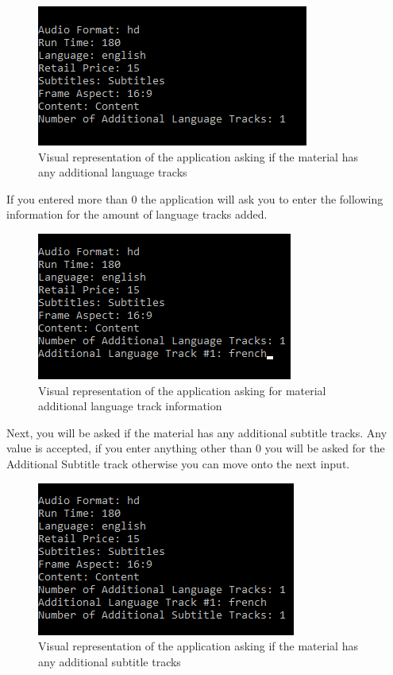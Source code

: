 \documentclass[
  english,
  a4paper,
,tablecaptionabove
]{scrartcl}
\begin{document}
\begin{figure}
\centering
\includegraphics{images/user-guide/maintenance-mode/add-material-number-of-additional-language-tracks.png}
\caption{Visual representation of the application asking if the material
has any additional language tracks}
\end{figure}

If you entered more than 0 the application will ask you to enter the
following information for the amount of language tracks added.

\begin{figure}
\centering
\includegraphics{images/user-guide/maintenance-mode/add-material-additional-language-track.png}
\caption{Visual representation of the application asking for material
additional language track information}
\end{figure}

Next, you will be asked if the material has any additional subtitle
tracks. Any value is accepted, if you enter anything other than 0 you
will be asked for the Additional Subtitle track otherwise you can move
onto the next input.

\begin{figure}
\centering
\includegraphics{images/user-guide/maintenance-mode/add-material-number-of-additional-subtitle-tracks.png}
\caption{Visual representation of the application asking if the material
has any additional subtitle tracks}
\end{figure}
\end{document}
